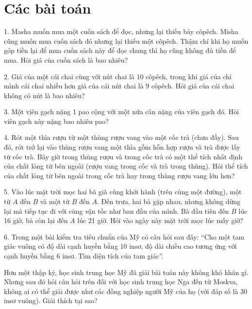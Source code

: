 \clearpage
\section*{Các bài toán}

\begin{problem}{1.}
	Masha muốn mua một cuốn sách để đọc, nhưng lại thiếu bảy côpêch. Misha cũng muốn mua cuốn sách đó nhưng lại thiếu một côpêch. Thậm chí khi họ muốn góp tiền lại để mua cuốn sách này để đọc chung thì họ cũng không đủ tiền để mua. Hỏi giá của cuốn sách là bao nhiêu?
\end{problem}

\begin{problem}{2.}
	Giá của một cái chai cùng với nút chai là 10 côpêch, trong khi giá của chỉ mình cái chai nhiều hơn giá của cái nút chai là 9 côpêch. Hỏi giá của cái chai không có nút là bao nhiêu?
\end{problem}

\begin{problem}{3.}
	Một viên gạch nặng 1 pao cộng với một nửa cân nặng của viên gạch đó. Hỏi viên gạch này nặng bao nhiêu pao?
\end{problem}

\begin{problem}{4.}
	Rót một thìa rượu  từ một thùng rượu vang vào một cốc  trà (chưa đầy). Sau đó, rót trở lại vào thùng rượu vang một thìa gồm hỗn hợp rượu và trà được lấy từ cốc trà. Bây giờ trong thùng rượu và trong cốc trà có một thể tích  nhất định của chất lỏng từ bên ngoài (rượu  vang trong cốc và trà trong thùng).    Hỏi thể tích của chất lỏng từ bên ngoài trong cốc trà hay trong thùng rượu vang lớn hơn?
\end{problem}

\begin{problem}{5.}
	Vào lúc mặt trời mọc   hai bà già  cùng khởi hành  (trên cùng một đường), một từ $A$ đến $B$ và một từ $B$ đến $A$. Đến trưa, hai bà gặp nhau, nhưng không dừng lại mà tiếp tục đi với cùng vận tốc như ban đầu của mình. Bà đầu tiên đến $B$ lúc 16 giờ, bà còn lại đến $A$ lúc 21 giờ. Hỏi vào ngày này mặt trời mọc lúc mấy giờ?
\end{problem}

\begin{problem}{6.}
	Trong một bài kiểm tra tiêu chuẩn của Mỹ có câu hỏi sau đây: \enquote{Cho một tam giác vuông có độ dài cạnh huyền bằng 10 insơ, độ dài chiều cao tương  ứng với  cạnh huyền bằng 6 insơ. Tìm diện tích của tam giác}.

	Hơn một thập kỷ, học sinh trung học Mỹ  đã giải bài toán này không khó khăn gì. Nhưng sau đó hỏi câu hỏi trên đối với  học sinh trung học Nga đến từ Moskva, không ai có thể giải được  như các đồng nghiệp người Mỹ của họ (với đáp số  là 30 insơ vuông).   Giải thích tại sao?
\end{problem}

